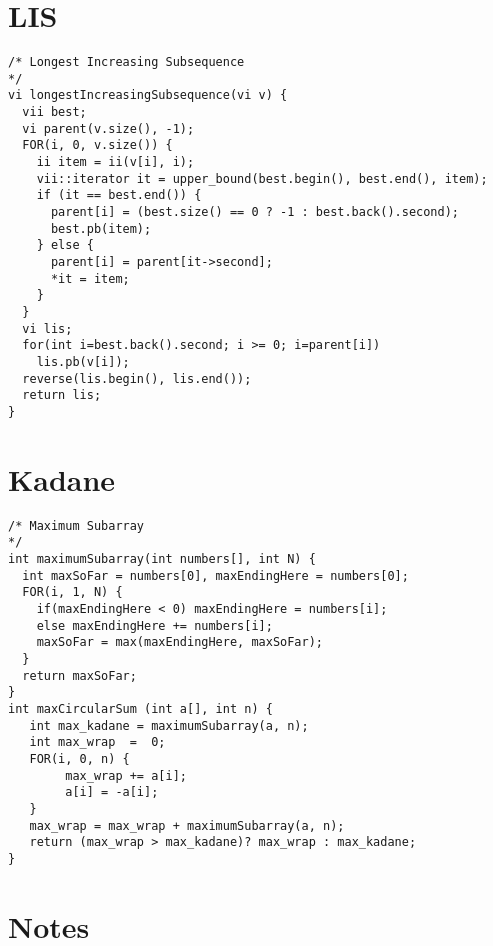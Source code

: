 \documentclass[8pt, oneside]{extarticle}
\begin{document}
\begin{multicols}{3}
\section{LIS}


\begin{lstlisting}
/* Longest Increasing Subsequence
*/
vi longestIncreasingSubsequence(vi v) {
  vii best;
  vi parent(v.size(), -1);
  FOR(i, 0, v.size()) {
    ii item = ii(v[i], i);
    vii::iterator it = upper_bound(best.begin(), best.end(), item);
    if (it == best.end()) {
      parent[i] = (best.size() == 0 ? -1 : best.back().second);
      best.pb(item);
    } else {
      parent[i] = parent[it->second];
      *it = item;
    }
  }
  vi lis;
  for(int i=best.back().second; i >= 0; i=parent[i])
    lis.pb(v[i]);
  reverse(lis.begin(), lis.end());
  return lis;
}
\end{lstlisting}

\section{Kadane}

\begin{lstlisting}
/* Maximum Subarray
*/
int maximumSubarray(int numbers[], int N) {
  int maxSoFar = numbers[0], maxEndingHere = numbers[0];
  FOR(i, 1, N) {
    if(maxEndingHere < 0) maxEndingHere = numbers[i];
    else maxEndingHere += numbers[i];
    maxSoFar = max(maxEndingHere, maxSoFar);
  }
  return maxSoFar;
}
int maxCircularSum (int a[], int n) {
   int max_kadane = maximumSubarray(a, n);
   int max_wrap  =  0;
   FOR(i, 0, n) {
        max_wrap += a[i];
        a[i] = -a[i];
   }
   max_wrap = max_wrap + maximumSubarray(a, n);
   return (max_wrap > max_kadane)? max_wrap : max_kadane;
}
\end{lstlisting}

\section{Notes}


\end{multicols}
\end{document}
